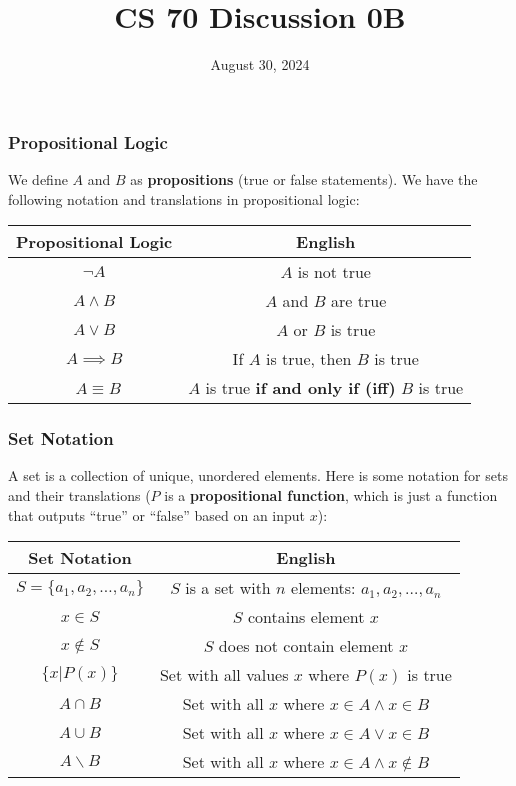 \documentclass{beamer}
\title{CS 70 Discussion 0B}
\date{August 30, 2024}
\begin{document}
\frame{\titlepage}

\begin{frame}
    \frametitle{Propositional Logic}
    We define $A$ and $B$ as {\bf propositions} (true or false statements). We have the following notation and translations in propositional logic:
    \begin{center}
        \begin{tabular}{c|c}
            Propositional Logic & English\\
            \hline
            $\neg A$ & $A$ is not true\\
            $A\wedge B$ & $A$ and $B$ are true\\
            $A\vee B$ & $A$ or $B$ is true\\
            $A\implies B$ & If $A$ is true, then $B$ is true\\\
            $A\equiv B$ & $A$ is true {\bf if and only if (iff)} $B$ is true
        \end{tabular}
    \end{center}
\end{frame}

\begin{frame}
    \frametitle{Set Notation}
    A set is a collection of unique, unordered elements. Here is some notation for sets and their translations ($P$ is a {\bf propositional function}, which is just a function that outputs ``true'' or ``false'' based on an input $x$):
    \begin{center}
        \begin{tabular}{c|c}
            Set Notation & English\\
            \hline
            $S=\{a_1,a_2,\dots,a_n\}$ & $S$ is a set with $n$ elements: $a_1,a_2,\dots,a_n$\\
            $x\in S$ & $S$ contains element $x$\\
            $x\not\in S$ & $S$ does not contain element $x$\\
            $\{x|P(x)\}$ & Set with all values $x$ where $P(x)$ is true\\
            $A\cap B$ & Set with all $x$ where $x\in A\wedge x\in B$\\
            $A\cup B$ & Set with all $x$ where $x\in A\vee x\in B$\\
            $A\backslash B$ & Set with all $x$ where $x\in A\wedge x\not\in B$
        \end{tabular}
    \end{center}
\end{frame}
\end{document}
